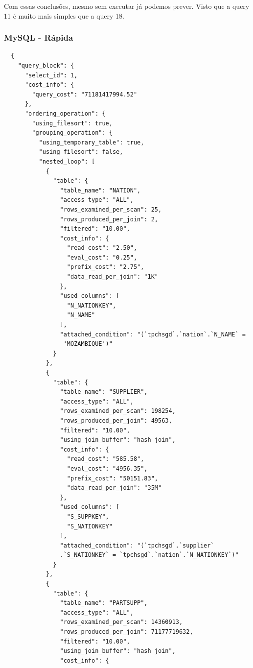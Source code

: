 \documentclass{article}
\begin{document}
Com essas conclusões, mesmo sem executar já podemos prever. Visto que a query 11 é muito mais simples que a query 18.



\subsubsection{MySQL - Rápida}
\begin{lstlisting}
  {
    "query_block": {
      "select_id": 1,
      "cost_info": {
        "query_cost": "71181417994.52"
      },
      "ordering_operation": {
        "using_filesort": true,
        "grouping_operation": {
          "using_temporary_table": true,
          "using_filesort": false,
          "nested_loop": [
            {
              "table": {
                "table_name": "NATION",
                "access_type": "ALL",
                "rows_examined_per_scan": 25,
                "rows_produced_per_join": 2,
                "filtered": "10.00",
                "cost_info": {
                  "read_cost": "2.50",
                  "eval_cost": "0.25",
                  "prefix_cost": "2.75",
                  "data_read_per_join": "1K"
                },
                "used_columns": [
                  "N_NATIONKEY",
                  "N_NAME"
                ],
                "attached_condition": "(`tpchsgd`.`nation`.`N_NAME` =
                 'MOZAMBIQUE')"
              }
            },
            {
              "table": {
                "table_name": "SUPPLIER",
                "access_type": "ALL",
                "rows_examined_per_scan": 198254,
                "rows_produced_per_join": 49563,
                "filtered": "10.00",
                "using_join_buffer": "hash join",
                "cost_info": {
                  "read_cost": "585.58",
                  "eval_cost": "4956.35",
                  "prefix_cost": "50151.83",
                  "data_read_per_join": "35M"
                },
                "used_columns": [
                  "S_SUPPKEY",
                  "S_NATIONKEY"
                ],
                "attached_condition": "(`tpchsgd`.`supplier`
                .`S_NATIONKEY` = `tpchsgd`.`nation`.`N_NATIONKEY`)"
              }
            },
            {
              "table": {
                "table_name": "PARTSUPP",
                "access_type": "ALL",
                "rows_examined_per_scan": 14360913,
                "rows_produced_per_join": 71177719632,
                "filtered": "10.00",
                "using_join_buffer": "hash join",
                "cost_info": {

\end{lstlisting}
\end{document}
